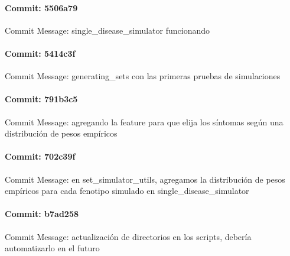 \documentclass{article}
\begin{document}
\paragraph{Commit: 5506a79}
Commit Message: single_disease_simulator funcionando

\paragraph{Commit: 5414c3f}
Commit Message: generating_sets con las primeras pruebas de simulaciones

\paragraph{Commit: 791b3c5}
Commit Message: agregando la feature para que elija los síntomas según una distribución de pesos empíricos

\paragraph{Commit: 702c39f}
Commit Message: en set_simulator_utils, agregamos la distribución de pesos empíricos para cada fenotipo simulado en single_disease_simulator

\paragraph{Commit: b7ad258}
Commit Message: actualización de directorios en los scripts, debería automatizarlo en el futuro

\end{document}
